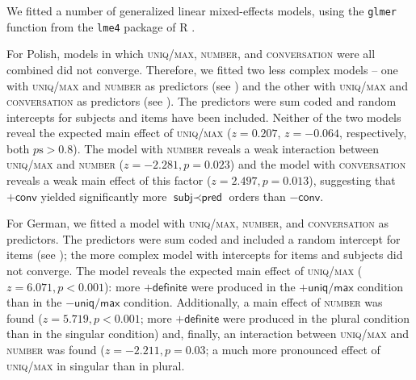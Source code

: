 \documentclass[output=paper]{langscibook}
\begin{document}
We fitted a number of generalized linear mixed-effects models, using the \texttt{glmer} function from the \texttt{lme4} package \citep{Bates.etal2015} of R \citep{RCore2017}.

For Polish, models in which \textsc{uniq/max}, \textsc{number}, and \textsc{conversation} were all combined did not converge. Therefore, we fitted two less complex models -- one with \textsc{uniq/max} and \textsc{number} as predictors (see ) and the other with \textsc{uniq/max} and \textsc{conversation} as predictors (see ). The predictors were sum coded and random intercepts for subjects and items have been included. Neither of the two models reveal the expected main effect of \textsc{uniq/max} ($z=0.207$, $z=-0.064$, respectively, both $p\text{s}>0.8$). The model with \textsc{number} reveals a weak interaction between \textsc{uniq/max} and \textsc{number} ($z=-2.281,p=0.023$) and the model with \textsc{conversation} reveals a weak main effect of this factor ($z=2.497,p=0.013$), suggesting that $+\textsf{conv}$ yielded significantly more $\textsf{subj}\prec\textsf{pred}$ orders than $-\textsf{conv}$.

For German, we fitted a model with \textsc{uniq/max}, \textsc{number}, and \textsc{conversation} as predictors. The predictors were sum coded and included a random intercept for items (see ); the more complex model with intercepts for items and subjects did not converge. The model reveals the expected main effect of \textsc{uniq/max} ($z=6.071,p<0.001$): more $+\textsf{definite}$ were produced in the $+\textsf{uniq/max}$ condition than in the $-\textsf{uniq/max}$ condition. Additionally, a main effect of \textsc{number} was found ($z=5.719,p<0.001$; more $+\textsf{definite}$ were produced in the \textsf{plural} condition than in the \textsf{singular} condition) and, finally, an interaction between \textsc{uniq/max} and \textsc{number} was found ($z=-2.211,p=0.03$; a much more pronounced effect of \textsc{uniq/max} in \textsf{singular} than in \textsf{plural}.

\end{document}
